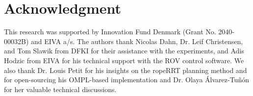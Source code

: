 







\section*{Acknowledgment}
This research was supported by Innovation Fund Denmark (Grant No. 2040-00032B) and EIVA a/s. The authors thank Nicolas Dahn, Dr. Leif Christensen, and Tom Slawik from DFKI for their assistance with the experiments, and Adis Hodzic from EIVA for his technical support with the ROV control software. We also thank Dr. Louis Petit for his insights on the ropeRRT planning method and for open-sourcing his OMPL-based implementation and Dr. Olaya Álvarez-Tuñón for her valuable technical discussions.